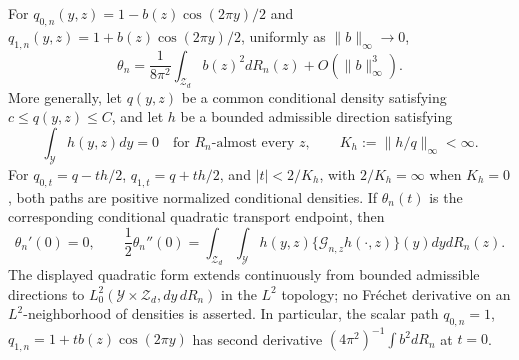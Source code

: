 For \(q_{0,n}(y,z)=1-b(z)\cos(2\pi y)/2\) and \(q_{1,n}(y,z)=1+b(z)\cos(2\pi y)/2\), uniformly as \(\|b\|_{\infty}\to0\),
\[
\theta_n=\frac{1}{8\pi^2}\int_{\mathcal Z_d}b(z)^2dR_n(z)+O(\|b\|_{\infty}^3).
\]
More generally, let \(q(y,z)\) be a common conditional density satisfying \(c\le q(y,z)\le C\), and let \(h\) be a bounded admissible direction satisfying
\[
\int_{\mathcal Y}h(y,z)dy=0\quad\text{for }R_n\text{-almost every }z,
\qquad K_h:=\|h/q\|_{\infty}<\infty.
\]
For \(q_{0,t}=q-th/2\), \(q_{1,t}=q+th/2\), and \(|t|<2/K_h\), with \(2/K_h=\infty\) when \(K_h=0\), both paths are positive normalized conditional densities. If \(\theta_n(t)\) is the corresponding conditional quadratic transport endpoint, then
\[
\theta_n'(0)=0,
\qquad
\frac12\theta_n''(0)
=\int_{\mathcal Z_d}\int_{\mathcal Y}
h(y,z)\{\mathcal G_{n,z}h(\cdot,z)\}(y)dydR_n(z).
\]
The displayed quadratic form extends continuously from bounded admissible directions to \(L_0^2(\mathcal Y\times\mathcal Z_d,dy\,dR_n)\) in the \(L^2\) topology; no Fr\'echet derivative on an \(L^2\)-neighborhood of densities is asserted. In particular, the scalar path \(q_{0,n}=1\), \(q_{1,n}=1+t b(z)\cos(2\pi y)\) has second derivative \((4\pi^2)^{-1}\int b^2dR_n\) at \(t=0\).